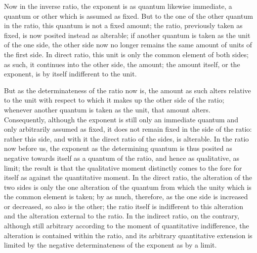 Now in the inverse ratio,
the exponent is as quantum likewise immediate,
a quantum or other which is assumed as fixed.
But to the one of the other quantum in the ratio,
this quantum is not a fixed amount; the ratio,
previously taken as fixed, is now posited instead as alterable;
if another quantum is taken as
the unit of the one side,
the other side now no longer remains
the same amount of units of the first side.
In direct ratio, this unit
is only the common element of both sides;
as such, it continues into the other side, the amount;
the amount itself, or the exponent,
is by itself indifferent to the unit.

But as the determinateness of the ratio now is,
the amount as such alters relative to the unit
with respect to which it makes up the other side of the ratio;
whenever another quantum is taken as the unit,
that amount alters.
Consequently, although the exponent is
still only an immediate quantum
and only arbitrarily assumed as fixed,
it does not remain fixed in the side of the ratio:
rather this side, and with it
the direct ratio of the sides, is alterable.
In the ratio now before us,
the exponent as the determining quantum is
thus posited as negative towards itself
as a quantum of the ratio,
and hence as qualitative, as limit;
the result is that the qualitative moment distinctly comes
to the fore for itself as against the quantitative moment.
In the direct ratio, the alteration of the two sides is
only the one alteration of the quantum
from which the unity which is the common element is taken;
by as much, therefore, as the one side is
increased or decreased, so also is the other;
the ratio itself is indifferent to this alteration
and the alteration external to the ratio.
In the indirect ratio, on the contrary,
although still arbitrary according to
the moment of quantitative indifference,
the alteration is contained within the ratio,
and its arbitrary quantitative extension is
limited by the negative determinateness
of the exponent as by a limit.

